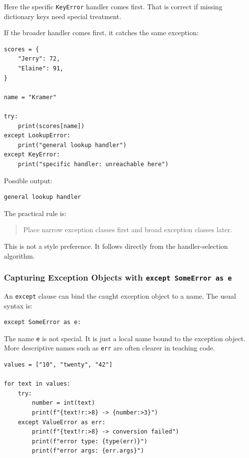\documentclass[a4paper,twoside]{report}
\begin{document}
Here the specific \texttt{KeyError} handler comes first. That is correct if missing dictionary keys need special treatment.

If the broader handler comes first, it catches the same exception:

\begin{verbatim}
scores = {
    "Jerry": 72,
    "Elaine": 91,
}

name = "Kramer"

try:
    print(scores[name])
except LookupError:
    print("general lookup handler")
except KeyError:
    print("specific handler: unreachable here")
\end{verbatim}

Possible output:

\begin{verbatim}
general lookup handler
\end{verbatim}

The practical rule is:

\begin{quote}
Place narrow exception classes first and broad exception classes later.
\end{quote}

This is not a style preference. It follows directly from the handler-selection algorithm.

\subsubsection{Capturing Exception Objects with \texttt{except SomeError as e}}

An \texttt{except} clause can bind the caught exception object to a name. The usual syntax is:

\begin{verbatim}
except SomeError as e:
\end{verbatim}

The name \texttt{e} is not special. It is just a local name bound to the exception object. More descriptive names such as \texttt{err} are often clearer in teaching code.

\begin{verbatim}
values = ["10", "twenty", "42"]

for text in values:
    try:
        number = int(text)
        print(f"{text!r:>8} -> {number:>3}")
    except ValueError as err:
        print(f"{text!r:>8} -> conversion failed")
        print(f"error type: {type(err)}")
        print(f"error args: {err.args}")
\end{verbatim}
\end{document}
